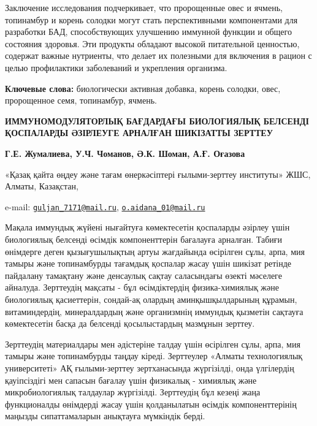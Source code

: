 Заключение исследования подчеркивает, что пророщенные овес и ячмень,
топинамбур и корень солодки могут стать перспективными компонентами для
разработки БАД, способствующих улучшению иммунной функции и общего
состояния здоровья. Эти продукты обладают высокой питательной ценностью,
содержат важные нутриенты, что делает их полезными для включения в
рацион с целью профилактики заболеваний и укрепления организма.

{\bfseries Ключевые слова:} биологически активная добавка, корень солодки,
овес, пророщенное семя, топинамбур, ячмень.

\begin{articleheader}
{\bfseries ИММУНОМОДУЛЯТОРЛЫҚ БАҒДАРДАҒЫ БИОЛОГИЯЛЫҚ БЕЛСЕНДІ ҚОСПАЛАРДЫ ӘЗІРЛЕУГЕ АРНАЛҒАН ШИКІЗАТТЫ ЗЕРТТЕУ}

{\bfseries
Г.Е. Жумалиева\textsuperscript{\envelope },
У.Ч. Чоманов,
Ә.К. Шоман,
А.Ғ. Оғазова\textsuperscript{\envelope }
}
\end{articleheader}

\begin{affiliation}
«Қазақ қайта өңдеу және тағам өнеркәсіптері ғылыми-зерттеу институты»
ЖШС, Алматы, Казақстан,

e-mail:
\href{mailto:guljan_7171@mail.ru}{\nolinkurl{guljan\_7171@mail.ru}},
\href{mailto:o.aidana_01@mail.ru}{\nolinkurl{o.aidana\_01@mail.ru}}
\end{affiliation}

Мақала иммундық жүйені нығайтуға көмектесетін қоспаларды әзірлеу үшін
биологиялық белсенді өсімдік компоненттерін бағалауға арналған. Табиғи
өнімдерге деген қызығушылықтың артуы жағдайында өсірілген сұлы, арпа,
мия тамыры және топинамбурды тағамдық қоспалар жасау үшін шикізат
ретінде пайдалану тамақтану және денсаулық сақтау саласындағы өзекті
мәселеге айналуда. Зерттеудің мақсаты - бұл өсімдіктердің
физика-химиялық және биологиялық қасиеттерін, сондай-ақ олардың
аминқышқылдарының құрамын, витаминдердің, минералдардың және организмнің
иммундық қызметін сақтауға көмектесетін басқа да белсенді қосылыстардың
мазмұнын зерттеу.

Зерттеудің материалдары мен әдістеріне талдау үшін өсірілген сұлы, арпа,
мия тамыры және топинамбурды таңдау кіреді. Зерттеулер «Алматы
технологиялық университеті» АҚ ғылыми-зерттеу зертханасында жүргізілді,
онда үлгілердің қауіпсіздігі мен сапасын бағалау үшін физикалық - химиялық
және микробиологиялық талдаулар жүргізілді. Зерттеудің бұл кезеңі жаңа
функционалды өнімдерді жасау үшін қолданылатын өсімдік компоненттерінің
маңызды сипаттамаларын анықтауға мүмкіндік берді.

